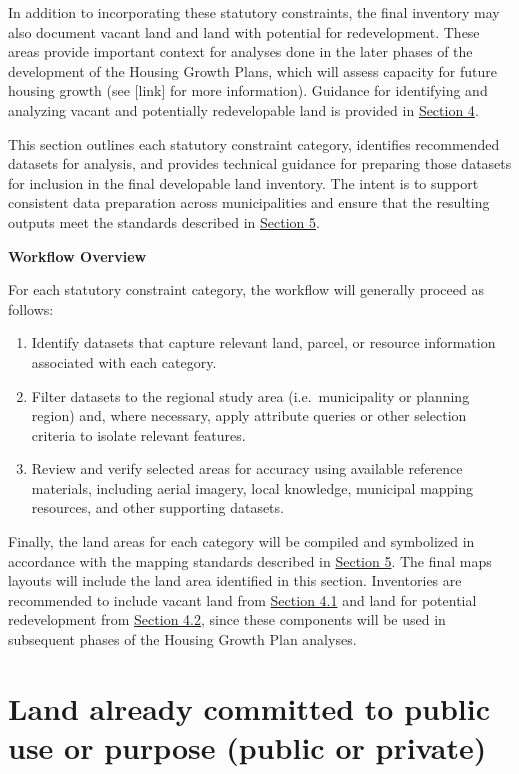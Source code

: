 \documentclass[
  letterpaper,
  DIV=11,
  numbers=noendperiod]{scrreprt}
\providecommand{\tightlist}{%
  \setlength{\itemsep}{0pt}\setlength{\parskip}{0pt}}
\begin{document}
In addition to incorporating these statutory constraints, the final
inventory may also document vacant land and land with potential for
redevelopment. These areas provide important context for analyses done
in the later phases of the development of the Housing Growth Plans,
which will assess capacity for future housing growth (see {[}link{]} for
more information). Guidance for identifying and analyzing vacant and
potentially redevelopable land is provided in
\href{vac_redev.qmd}{Section 4}.

This section outlines each statutory constraint category, identifies
recommended datasets for analysis, and provides technical guidance for
preparing those datasets for inclusion in the final developable land
inventory. The intent is to support consistent data preparation across
municipalities and ensure that the resulting outputs meet the standards
described in \href{map.qmd}{Section 5}.

\textbf{Workflow Overview}

For each statutory constraint category, the workflow will generally
proceed as follows:

\begin{enumerate}
\def\labelenumi{\arabic{enumi}.}
\tightlist
\item
  Identify datasets that capture relevant land, parcel, or resource
  information associated with each category.
\item
  Filter datasets to the regional study area (i.e.~municipality or
  planning region) and, where necessary, apply attribute queries or
  other selection criteria to isolate relevant features.
\item
  Review and verify selected areas for accuracy using available
  reference materials, including aerial imagery, local knowledge,
  municipal mapping resources, and other supporting datasets.
\end{enumerate}

Finally, the land areas for each category will be compiled and
symbolized in accordance with the mapping standards described in
\href{map.qmd}{Section 5}. The final maps layouts will include the land
area identified in this section. Inventories are recommended to include
vacant land from \href{vac_redev.qmd}{Section 4.1} and land for
potential redevelopment from \href{vac_redev.qmd}{Section 4.2}, since
these components will be used in subsequent phases of the Housing Growth
Plan analyses.

\section{Land already committed to public use or purpose (public or
private)}\label{land-already-committed-to-public-use-or-purpose-public-or-private}
\end{document}
